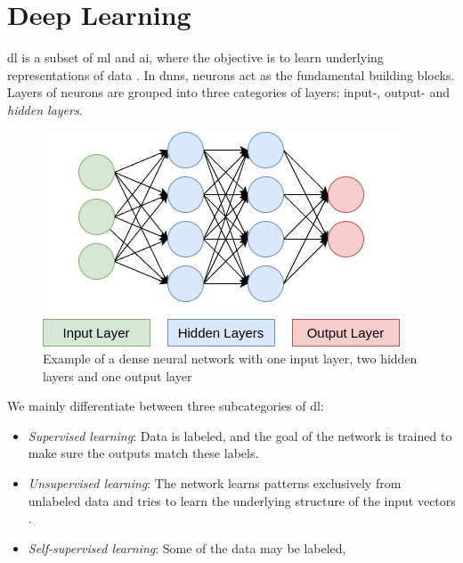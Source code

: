 \section{Deep Learning}

\acrfull{dl} is a subset of \acrshort{ml} and \acrshort{ai}, where the objective is to learn underlying representations of data \cite{lecun2015deep}. In \acrshort{dnn}s, neurons act as the fundamental building blocks. Layers of neurons are grouped into three categories of layers: input-, output- and \textit{hidden layers}.  

\begin{figure}[!h]
    \centering
    \includegraphics[width=0.5\linewidth]{figures/dnn.png}
    \caption{Example of a dense neural network with one input layer, two hidden layers and one output layer}
    \label{fig:densenn}
\end{figure}

We mainly differentiate between three subcategories of \acrshort{dl}:

\begin{itemize}
    \item \textit{Supervised learning}: Data is labeled, and the goal of the network is trained to make sure the outputs match these labels.
    \item \textit{Unsupervised learning}: The network learns patterns exclusively from unlabeled data and tries to learn the underlying structure of the input vectors \cite{KARHUNEN2015125}. 
    \item \textit{Self-supervised learning}: Some of the data may be labeled, 
\end{itemize}





\clearpage

\clearpage

